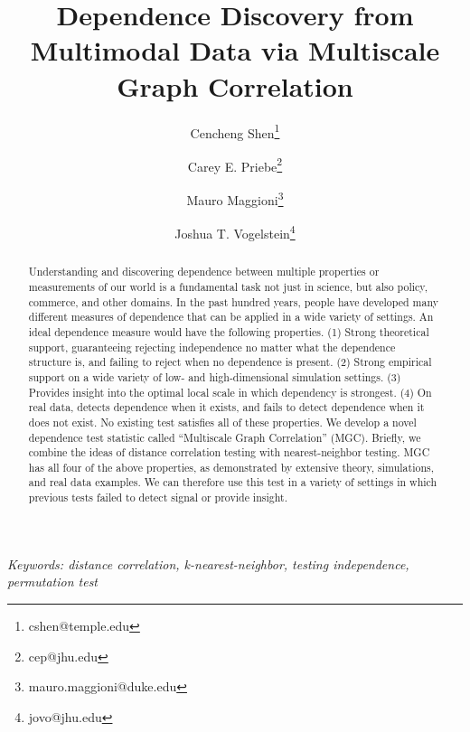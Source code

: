 \documentclass[11pt]{article}
\begin{document}
\def\spacingset#1{\renewcommand{\baselinestretch}%
{#1}\small\normalsize} \spacingset{1}

\title{\bf Dependence Discovery from Multimodal Data via  Multiscale Graph Correlation}
\author[1]{Cencheng Shen\thanks{cshen@temple.edu}}
\author[2]{Carey E. Priebe\thanks{cep@jhu.edu}}
\author[3]{Mauro Maggioni\thanks{mauro.maggioni@duke.edu}}
\author[4]{Joshua T. Vogelstein\thanks{jovo@jhu.edu}}
\maketitle
\pagestyle{empty}

\bigskip
\begin{abstract}
Understanding and discovering dependence between multiple properties or measurements of our world is a fundamental task not just in science, but also policy, commerce, and other domains. In the past hundred years, people have developed many different measures of dependence that can be applied in a wide variety of settings.  An ideal dependence measure would have the following properties. (1) Strong theoretical support, guaranteeing rejecting independence no matter what the dependence structure is, and failing to reject when no dependence is present. (2) Strong empirical support on a wide variety of low- and high-dimensional simulation settings. (3) Provides insight into the optimal local scale in which dependency is strongest. (4) On real data, detects dependence when it exists, and fails to detect dependence when it does not exist. No existing test satisfies all of these properties. We develop a novel dependence test statistic called ``Multiscale Graph Correlation'' (MGC).  Briefly, we combine the ideas of distance correlation testing with nearest-neighbor testing.  MGC has all four of the above properties, as demonstrated by extensive theory, simulations, and real data examples. We can therefore use this test in a variety of settings in which previous tests failed to detect signal or provide insight.
\end{abstract}

\noindent%
{\it Keywords: distance correlation, k-nearest-neighbor, testing independence, permutation test}  
\vfill
\end{document}

